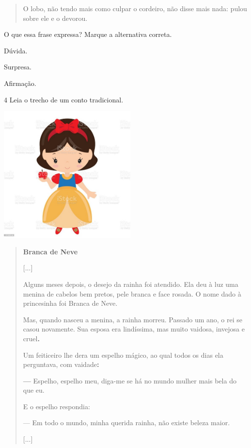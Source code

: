\begin{quote}
O lobo, não tendo mais como culpar o cordeiro, não disse mais nada:
pulou sobre ele e o devorou.
\end{quote}

O que essa frase expressa? Marque a alternativa correta.

\begin{boxlist}
\boxitem[] Dúvida.

\boxitem[] Surpresa.

\boxitem[X] Afirmação.
\end{boxlist}

\num{4} Leia o trecho de um conto tradicional.



\includegraphics[width=2.71875in,height=2.71875in]{./media/image6.jpeg}

\begin{quote}
\textbf{Branca de Neve}

{[}...{]}

Alguns meses depois, o desejo da rainha foi atendido. Ela deu à luz uma
menina de cabelos bem pretos, pele branca e face rosada. O nome dado à
princesinha foi Branca de Neve.

Mas, quando nasceu a menina, a rainha morreu. Passado um ano, o rei se
casou novamente. Sua esposa era lindíssima, mas muito vaidosa, invejosa
e cruel\textbf{.}

Um feiticeiro lhe dera um espelho mágico, ao qual todos os dias ela
perguntava, com vaidade\textbf{:}

\textbf{---} Espelho, espelho meu, diga-me se há no mundo mulher mais bela do que
eu.

E o espelho respondia:

--- Em todo o mundo, minha querida rainha, não existe beleza maior.

{[}...{]}

\end{quote}


